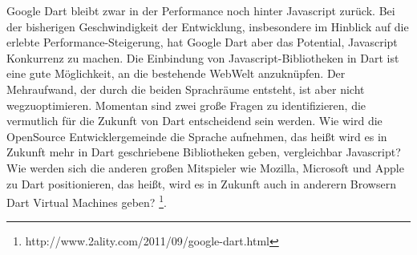 Google Dart bleibt zwar in der Performance noch hinter Javascript zurück. Bei der bisherigen Geschwindigkeit der Entwicklung, insbesondere im Hinblick auf die erlebte Performance-Steigerung, hat Google Dart aber das Potential, Javascript Konkurrenz zu machen.
Die Einbindung von Javascript-Bibliotheken in Dart ist eine gute Möglichkeit, an die bestehende WebWelt anzuknüpfen. Der Mehraufwand, der durch die beiden Sprachräume entsteht, ist aber nicht wegzuoptimieren.
Momentan sind zwei große Fragen zu identifizieren, die vermutlich für die Zukunft von Dart entscheidend sein werden.
Wie wird die OpenSource Entwicklergemeinde die Sprache aufnehmen, das heißt wird es in Zukunft mehr in Dart geschriebene Bibliotheken geben, vergleichbar Javascript? 
\\
Wie werden sich die anderen großen Mitspieler wie Mozilla, Microsoft und Apple zu Dart positionieren, das heißt, wird es in Zukunft auch in anderern Browsern Dart Virtual Machines geben? \footnote{http://www.2ality.com/2011/09/google-dart.html}.


